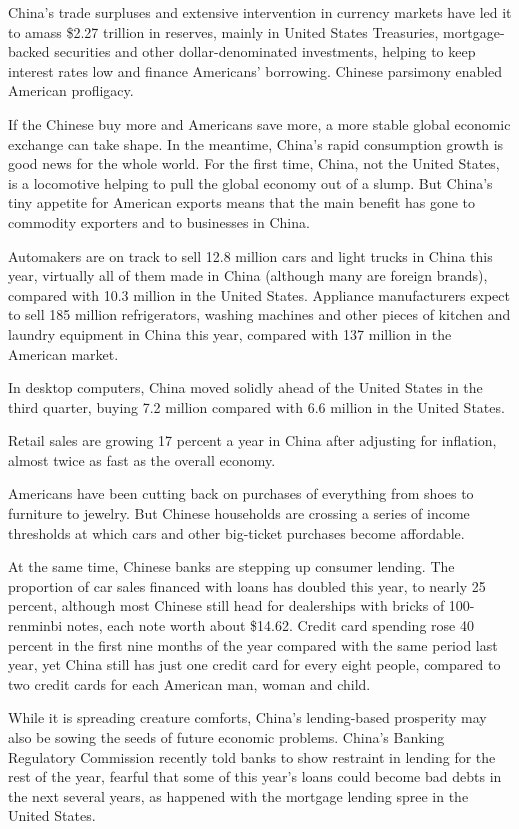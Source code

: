 ﻿\documentclass[12pt]{article}
\begin{document}
China's trade surpluses and extensive intervention in currency markets have led it to amass \$2.27
trillion in reserves, mainly in United States Treasuries, mortgage-backed securities and other
dollar-denominated investments, helping to keep interest rates low and finance Americans' borrowing.
Chinese parsimony enabled American profligacy.

If the Chinese buy more and Americans save more, a more stable global economic exchange can take
shape. In the meantime, China's rapid consumption growth is good news for the whole world. For the
first time, China, not the United States, is a locomotive helping to pull the global economy out of
a slump. But China's tiny appetite for American exports means that the main benefit has gone to
commodity exporters and to businesses in China.

Automakers are on track to sell 12.8 million cars and light trucks in China this year, virtually all
of them made in China (although many are foreign brands), compared with 10.3 million in the United
States. Appliance manufacturers expect to sell 185 million refrigerators, washing machines and other
pieces of kitchen and laundry equipment in China this year, compared with 137 million in the
American market.

In desktop computers, China moved solidly ahead of the United States in the third quarter, buying
7.2 million compared with 6.6 million in the United States.

Retail sales are growing 17 percent a year in China after adjusting for inflation, almost twice as
fast as the overall economy.

Americans have been cutting back on purchases of everything from shoes to furniture to jewelry. But
Chinese households are crossing a series of income thresholds at which cars and other big-ticket
purchases become affordable.

At the same time, Chinese banks are stepping up consumer lending. The proportion of car sales
financed with loans has doubled this year, to nearly 25 percent, although most Chinese still head
for dealerships with bricks of 100-renminbi notes, each note worth about \$14.62. Credit card
spending rose 40 percent in the first nine months of the year compared with the same period last
year, yet China still has just one credit card for every eight people, compared to two credit cards
for each American man, woman and child.

While it is spreading creature comforts, China's lending-based prosperity may also be sowing the
seeds of future economic problems. China's Banking Regulatory Commission recently told banks to show
restraint in lending for the rest of the year, fearful that some of this year's loans could become
bad debts in the next several years, as happened with the mortgage lending spree in the United
States.
\end{document}
